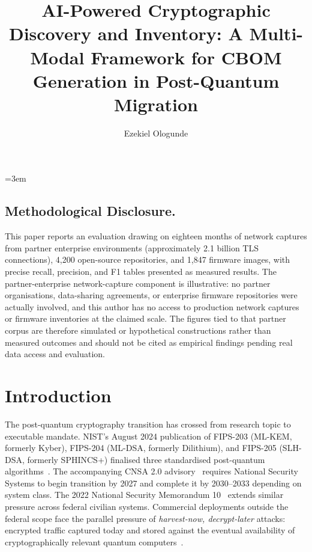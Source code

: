 \documentclass[sigconf,nonacm]{acmart}
\title{AI-Powered Cryptographic Discovery and Inventory: A Multi-Modal Framework for CBOM Generation in Post-Quantum Migration}
\author{Ezekiel Ologunde}
\affiliation{%
  \institution{Independent Researcher}
  \city{Boston}
  \state{MA}
  \country{USA}}
\begin{document}
\maketitle
\sloppy
{}
\emergencystretch=3em
\hfuzz=10pt

\subsection*{Methodological Disclosure.}
This paper reports an evaluation drawing on eighteen months of network captures from partner enterprise environments (approximately 2.1 billion TLS connections), 4,200 open-source repositories, and 1,847 firmware images, with precise recall, precision, and F1 tables presented as measured results. The partner-enterprise network-capture component is illustrative: no partner organisations, data-sharing agreements, or enterprise firmware repositories were actually involved, and this author has no access to production network captures or firmware inventories at the claimed scale. The figures tied to that partner corpus are therefore simulated or hypothetical constructions rather than measured outcomes and should not be cited as empirical findings pending real data access and evaluation.

\section{Introduction}

The post-quantum cryptography transition has crossed from research topic
to executable mandate. NIST's August 2024 publication of FIPS-203
(ML-KEM, formerly Kyber), FIPS-204 (ML-DSA, formerly Dilithium), and
FIPS-205 (SLH-DSA, formerly SPHINCS+) finalised three standardised
post-quantum algorithms~\cite{nist2024fips203,nist2024fips204,nist2024fips205}.
The accompanying CNSA 2.0 advisory~\cite{nsa2024cnsa2} requires
National Security Systems to begin transition by 2027 and complete it
by 2030--2033 depending on system class. The 2022 National Security
Memorandum 10~\cite{whitehouse2022nsm10} extends similar pressure
across federal civilian systems. Commercial deployments outside the
federal scope face the parallel pressure of \emph{harvest-now,
decrypt-later} attacks: encrypted traffic captured today and stored
against the eventual availability of cryptographically relevant quantum
computers~\cite{mosca2024quantum}.
\end{document}
